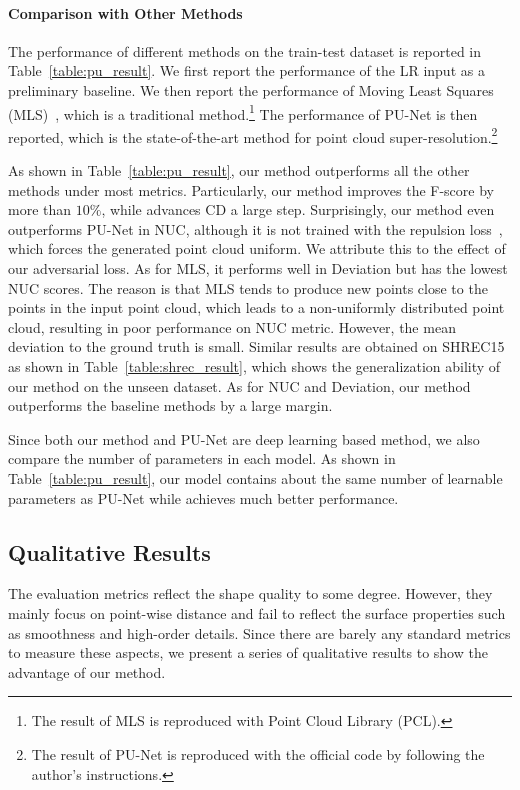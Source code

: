 \documentclass[10pt,twocolumn,letterpaper]{article}
\begin{document}
\paragraph{Comparison with Other Methods}
The performance of different methods on the train-test dataset is reported in Table~\ref{table:pu_result}.
We first report the performance of the LR input as a preliminary baseline.
We then report the performance of Moving Least Squares (MLS)~\cite{alexa2003computing}, which is a traditional method.\footnote{The result of MLS is reproduced with Point Cloud Library (PCL).}
The performance of PU-Net is then reported, which is the state-of-the-art method for point cloud super-resolution.\footnote{The result of PU-Net is reproduced with the official code by following the author's instructions.}

As shown in Table~\ref{table:pu_result}, our method outperforms all the other methods under most metrics.
Particularly, our method improves the F-score by more than $10\%$, while advances CD a large step.
Surprisingly, our method even outperforms PU-Net in NUC, although it is not trained with the repulsion loss~\cite{yu2018pu}, which forces the generated point cloud uniform.
We attribute this to the effect of our adversarial loss.
As for MLS, it performs well in Deviation but has the lowest NUC scores.
The reason is that MLS tends to produce new points close to the points in the input point cloud, which leads to a non-uniformly distributed point cloud, resulting in poor performance on NUC metric.
However, the mean deviation to the ground truth is small.
Similar results are obtained on SHREC15 as shown in Table~\ref{table:shrec_result}, which shows the generalization ability of our method on the unseen dataset.
As for NUC and Deviation, our method outperforms the baseline methods by a large margin.

Since both our method and PU-Net are deep learning based method, we also compare the number of parameters in each model.
As shown in Table~\ref{table:pu_result}, our model contains about the same number of learnable parameters as PU-Net while achieves much better performance.

\subsection{Qualitative Results}
The evaluation metrics reflect the shape quality to some degree.
However, they mainly focus on point-wise distance and fail to reflect the surface properties such as smoothness and high-order details.
Since there are barely any standard metrics to measure these aspects, we present a series of qualitative results to show the advantage of our method.
\end{document}
